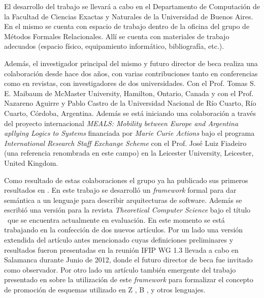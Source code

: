 \documentclass[a4paper, 11pt]{article}
\begin{document}
El desarrollo del trabajo se llevará a cabo en el Departamento de Computación de la Facultad de Ciencias Exactas y Naturales de la Universidad de Buenos Aires. En el mismo se cuenta con espacio de trabajo dentro de la oficina del grupo de Métodos Formales Relacionales. Allí se cuenta con materiales de trabajo adecuados (espacio físico, equipamiento informático, bibliografía, etc.).

Además, el investigador principal del mismo y futuro director de beca realiza una colaboración desde hace dos años, con varias contribuciones tanto en conferencias como en revistas, con investigadores de dos universidades. Con el Prof. Tomas S. E. Maibaum de McMaster University, Hamilton, Ontario, Canada y con el Prof. Nazareno Aguirre y Pablo Castro de la Universidad Nacional de Río Cuarto, Río Cuarto, Córdoba, Argentina. Además se está iniciando una colaboración a través del proyecto internacional \emph{MEALS: Mobility between Europe and Argentina apllying Logics to Systems} financiada por \emph{Marie Curie Actions} bajo el programa \emph{International Research Staff Exchange Scheme} con el Prof. José Luiz Fiadeiro (una referencia renombrada en este campo) en la Leicester University, Leicester, United Kingdom.

Como resultado de estas colaboraciones el grupo ya ha publicado sus primeros resultados en \cite{castro:ictac10}. En este trabajo se desarrolló un \emph{framework} formal para dar semántica a un lenguaje para describir arquitecturas de software. Además se escribió una versión para la revista \emph{Theoretical Computer Science} bajo el título \paperola\ que se encuentra actualmente en evaluación. En este momento se está trabajando en la confección de dos nuevos artículos. Por un lado una versión extendida del artículo antes mencionado cuyas definiciones preliminares y resultados fueron presentadas en la reunión IFIP WG 1.3 llevada a cabo en Salamanca durante Junio de 2012, donde el futuro director de beca fue invitado como observador. Por otro lado un artículo también emergente del trabajo presentado en \cite{castro:ictac10} sobre la utilización de este \emph{framework} para formalizar el concepto de promoción de esquemas utilizado en Z \cite{spivey88}, B \cite{abrial96}, y otros lenguajes.
\end{document}
